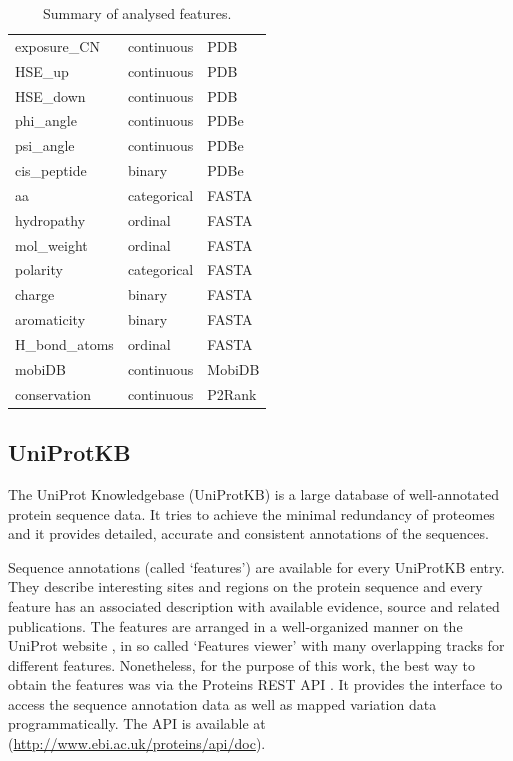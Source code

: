 \begin{table}[]
\begin{tabular}{@{}lll@{}}
exposure\_CN         & continuous  & PDB                   \\
HSE\_up              & continuous  & PDB                   \\
HSE\_down            & continuous  & PDB                   \\
phi\_angle           & continuous  & PDBe                  \\
psi\_angle           & continuous  & PDBe                  \\
cis\_peptide         & binary      & PDBe                  \\
aa                   & categorical & FASTA                 \\
hydropathy           & ordinal     & FASTA                 \\
mol\_weight          & ordinal     & FASTA                 \\
polarity             & categorical & FASTA                 \\
charge               & binary      & FASTA                 \\
aromaticity          & binary      & FASTA                 \\
H\_bond\_atoms       & ordinal     & FASTA                 \\
mobiDB               & continuous  & MobiDB                \\
conservation         & continuous  & P2Rank \\ \bottomrule
\end{tabular}
\caption{Summary of analysed features.}
\label{tab:features}
\end{table}

\subsection{UniProtKB}

The UniProt Knowledgebase (UniProtKB) \cite{uniprot} is a large database of well-annotated protein sequence data. It tries to achieve the minimal redundancy of proteomes and it provides detailed, accurate and consistent annotations of the sequences.

Sequence annotations (called `features') are available for every UniProtKB entry. They describe interesting sites and regions on the protein sequence and every feature has an associated description with available evidence, source and related publications. The features are arranged in a well-organized manner on the UniProt website \cite{uniprot_web}, in so called `Features viewer' with many overlapping tracks for different features. Nonetheless, for the purpose of this work, the best way to obtain the features was via the Proteins REST API \cite{proteins_api}. It provides the interface to  access the sequence annotation data as well as mapped variation data programmatically. The API is available at (\url{http://www.ebi.ac.uk/proteins/api/doc}).

